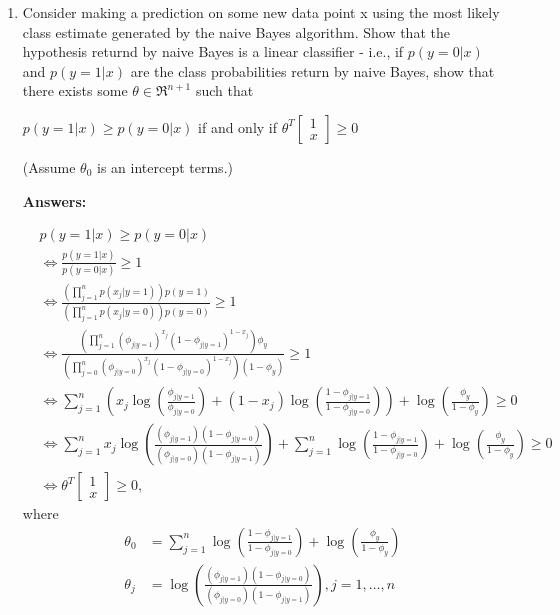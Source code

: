 \documentclass[a4paper,14pt]{article}
\begin{document}
\begin{enumerate}[label=(\alph*)]
    \item Consider making a prediction on some new data point x using the most likely class estimate generated by the naive Bayes algorithm.
    Show that the hypothesis returnd by naive Bayes is a linear classifier - i.e., if $p(y=0|x)$ and $p(y=1|x)$ are the class probabilities
    return by naive Bayes, show that there exists some $\theta \in \Re^{n+1}$ such that
    \begin{center}
    $p(y=1|x) \ge p(y=0|x)$ if and only if $\theta^{T}\begin{bmatrix}1 \\ x \end{bmatrix} \ge 0$
    \end{center}
    (Assume $\theta_{0}$ is an intercept terms.)

\textbf{Answers:}

\begin{align}
    &p(y=1|x) \ge p(y=0|x) \\
    &\Longleftrightarrow \frac{p(y=1|x)}{p(y=0|x)} \ge 1 \\
    &\Longleftrightarrow \frac{\left( \prod_{j=1}^{n} p(x_{j}|y=1) \right) p(y=1)}{\left( \prod_{j=1}^{n} p(x_{j}|y=0) \right) p(y=0)} \ge 1 \\
    &\Longleftrightarrow \frac{ \left( \prod_{j=1}^{n} (\phi_{j|y=1})^{x_{j}}(1-\phi_{j|y=1})^{1-x_{j}} \right)\phi_{y}}{\left( \prod_{j=0}^{n} (\phi_{j|y=0})^{x_{j}}(1-\phi_{j|y=0})^{1-x_{j}} \right)(1-\phi_{y})} \ge 1 \\
    &\Longleftrightarrow \sum_{j=1}^{n} \left( x_{j}\log \left( \frac{\phi_{j|y=1}}{\phi_{j|y=0}} \right) +(1-x_{j})\log \left( \frac{1-\phi_{j|y=1}}{1-\phi_{j|y=0}} \right)\right) + \log\left( \frac{ \phi_{y} }{ 1-\phi_{y} } \right) \ge 0 \\
    &\Longleftrightarrow \sum_{j=1}^{n} x_{j}\log \left( \frac{(\phi_{j|y=1})(1-\phi_{j|y=0})}{(\phi_{j|y=0})(1-\phi_{j|y=1})} \right) + \sum_{j=1}^{n} \log \left( \frac{1-\phi_{j|y=1}}{1-\phi_{j|y=0}} \right) + \log\left( \frac{ \phi_{y} }{ 1-\phi_{y} } \right) \ge 0 \\
    &\Longleftrightarrow \theta^{T} \begin{bmatrix}
        1 \\ x
    \end{bmatrix} \ge 0,
\end{align}
where
\begin{align*}
    \theta_{0} &= \sum_{j=1}^{n} \log \left( \frac{1-\phi_{j|y=1}}{1-\phi_{j|y=0}} \right) + \log\left( \frac{ \phi_{y} }{ 1-\phi_{y} } \right)\\
    \theta_{j} &= \log \left( \frac{(\phi_{j|y=1})(1-\phi_{j|y=0})}{(\phi_{j|y=0})(1-\phi_{j|y=1})} \right), j=1,\dots,n
\end{align*}
\end{enumerate}
\end{document}
